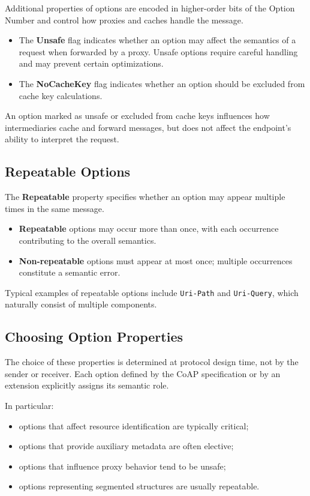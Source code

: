\documentclass{scrbook}
\begin{document}
Additional properties of options are encoded in higher-order bits of the Option Number and control how proxies and caches handle the message.

\begin{itemize}
    \item The \textbf{Unsafe} flag indicates whether an option may affect the semantics of a request when forwarded by a proxy. Unsafe options require careful handling and may prevent certain optimizations.
    \item The \textbf{NoCacheKey} flag indicates whether an option should be excluded from cache key calculations.
\end{itemize}

An option marked as unsafe or excluded from cache keys influences how intermediaries cache and forward messages, but does not affect the endpoint’s ability to interpret the request.

\subsection{Repeatable Options}

The \textbf{Repeatable} property specifies whether an option may appear multiple times in the same message.

\begin{itemize}
    \item \textbf{Repeatable} options may occur more than once, with each occurrence contributing to the overall semantics.
    \item \textbf{Non-repeatable} options must appear at most once; multiple occurrences constitute a semantic error.
\end{itemize}

Typical examples of repeatable options include \texttt{Uri-Path} and \texttt{Uri-Query}, which naturally consist of multiple components.

\subsection{Choosing Option Properties}

The choice of these properties is determined at protocol design time, not by the sender or receiver. Each option defined by the CoAP specification or by an extension explicitly assigns its semantic role.

In particular:

\begin{itemize}
    \item options that affect resource identification are typically critical;
    \item options that provide auxiliary metadata are often elective;
    \item options that influence proxy behavior tend to be unsafe;
    \item options representing segmented structures are usually repeatable.
\end{itemize}
\end{document}

